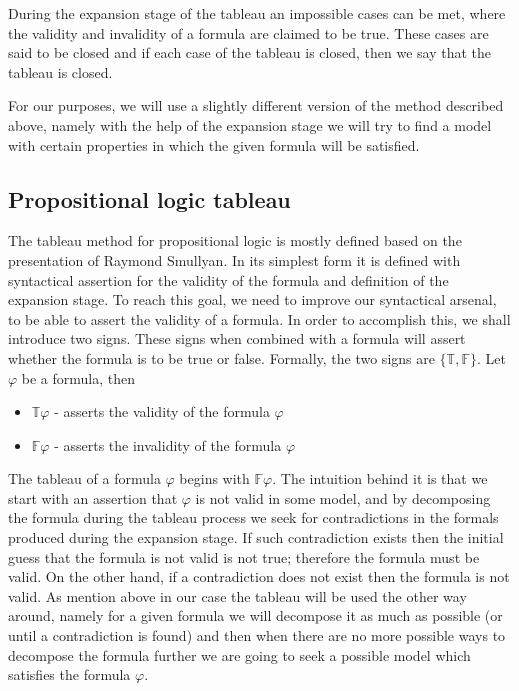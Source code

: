\documentclass{article}
\newcommand{\signT}{\mathbb{T}}
\newcommand{\signF}{\mathbb{F}}
\begin{document}
During the expansion stage of the tableau an impossible cases can be met, where the validity and invalidity of a formula are claimed to be true. These cases are said to be closed and if each case of the tableau is closed, then we say that the tableau is closed.

For our purposes, we will use a slightly different version of the method described above, namely with the help of the expansion stage we will try to find a model with certain properties in which the given formula will be satisfied.

		\subsection{Propositional logic tableau}
The tableau method for propositional logic is mostly defined based on the presentation of Raymond Smullyan. In its simplest form it is defined with syntactical assertion for the validity of the formula and definition of the expansion stage. To reach this goal, we need to improve our syntactical arsenal, to be able to assert the validity of a formula. In order to accomplish this, we shall introduce two signs. These signs when combined with a formula will assert whether the formula is to be true or false. Formally, the two signs are $\{ \signT, \signF \}$. Let $\varphi$ be a formula, then
\begin{itemize}
	\item $\signT \varphi$ - asserts the validity of the formula $\varphi$
	\item $\signF \varphi$ - asserts the invalidity of the formula $\varphi$
\end{itemize} 

The tableau of a formula $\varphi$ begins with $\signF \varphi$. The intuition behind it is that we start with an assertion that $\varphi$ is not valid in some model, and by decomposing the formula during the tableau process we seek for contradictions in the formals produced during the expansion stage. If such contradiction exists then the initial guess that the formula is not valid is not true; therefore the formula must be valid. On the other hand, if a contradiction does not exist then the formula is not valid. As mention above in our case the tableau will be used the other way around, namely for a given formula we will decompose it as much as possible (or until a contradiction is found) and then when there are no more possible ways to decompose the formula further we are going to seek a possible model which satisfies the formula $\varphi$. 
\end{document}
